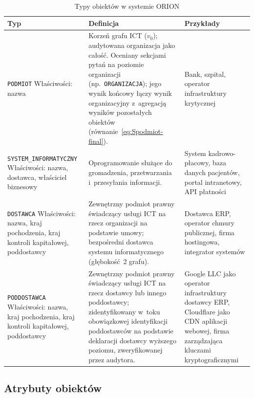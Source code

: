 \begin{table}[H]
\centering
\caption{Typy obiektów w systemie ORION}
\label{tab:typy-artefaktow}
\renewcommand{\arraystretch}{1.5}
\begin{tabular}{p{3cm}p{7cm}p{5cm}}
\toprule
\textbf{Typ} & \textbf{Definicja} & \textbf{Przykłady} \\
\midrule
\texttt{PODMIOT} 
\newline Właściwości: nazwa
& Korzeń grafu ICT ($v_0$); audytowana organizacja jako całość. 
  Oceniany sekcjami pytań na poziomie organizacji (np.\ \texttt{ORGANIZACJA}); 
  jego wynik końcowy łączy wynik organizacyjny z~agregacją wyników pozostałych obiektów
  (równanie~\eqref{eq:Spodmiot-final}).
& Bank, szpital, operator infrastruktury krytycznej \\

\midrule
\texttt{SYSTEM\_INFORMATYCZNY}
\newline Właściwości: nazwa, dostawca, właściciel biznesowy
&  Oprogramowanie służące do gromadzenia, przetwarzania i~przesyłania informacji.
& System kadrowo-płacowy, baza danych pacjentów, 
  portal intranetowy, API płatności \\
\midrule

\texttt{DOSTAWCA} 
\newline Właściwości: nazwa, kraj pochodzenia, kraj kontroli kapitałowej, poddostawcy
& Zewnętrzny podmiot prawny świadczący usługi ICT na rzecz 
  organizacji na podstawie umowy; bezpośredni dostawca 
  systemu informatycznego (głębokość~2 grafu).
& Dostawca ERP, operator chmury publicznej, 
  firma hostingowa, integrator systemów \\
\midrule
\texttt{PODDOSTAWCA}
\newline Właściwości: nazwa, kraj pochodzenia, kraj kontroli kapitałowej, poddostawcy
& Zewnętrzny podmiot prawny świadczący usługi ICT 
  na rzecz dostawcy lub innego poddostawcy; 
  zidentyfikowany w~toku obowiązkowej identyfikacji poddostawców 
  na podstawie deklaracji dostawcy wyższego poziomu, 
  zweryfikowanej przez audytora.
& Google LLC jako operator infrastruktury dostawcy ERP, 
  Cloudflare jako CDN aplikacji webowej, 
  firma zarządzająca kluczami kryptograficznymi \\
\bottomrule
\end{tabular}
\end{table}

\subsection{Atrybuty obiektów}


